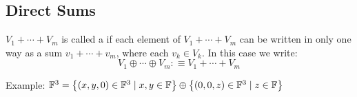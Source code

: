 \subsection{Direct Sums}

\setcounter{thm}{40}
\begin{mydef}
  \label{def: direct sum}
  $V_1 + \cdots + V_m$ is called a  if each element of $V_1 +\cdots+V_m$ can be written in only one way as a sum $v_1 + \cdots + v_m$, where each $v_k \in V_k$. In this case we write:
  \begin{equation}
    V_1 \oplus \cdots \oplus V_m :\equiv V_1 + \cdots + V_m
  \end{equation}
\end{mydef}

\begin{example}
  Example: $\mathbb{F}^3 =
  \left \{ \left ( x, y, 0 \right ) \in \mathbb{F}^3 \mid x,y \in \mathbb{F} \right \}
  \oplus
  \left \{ \left (  0, 0, z  \right ) \in \mathbb{F}^3 \mid z \in \mathbb{F} \right \}$
\end{example}


